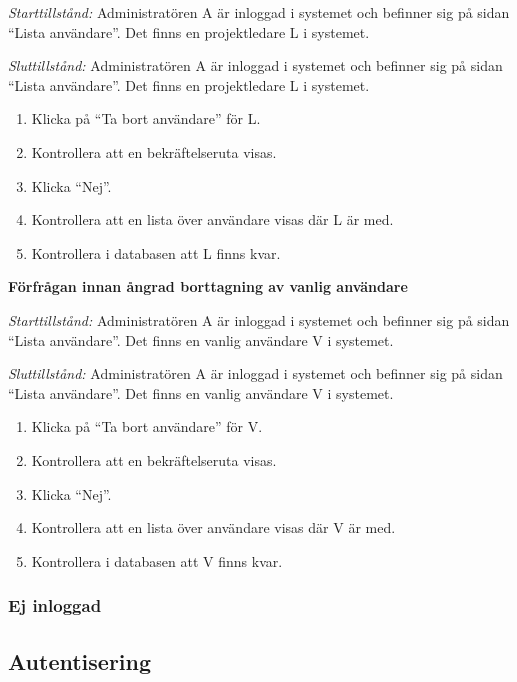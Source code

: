 \documentclass[a4paper]{article}
\begin{document}
\begin{FT}
\emph{Starttillstånd:} Administratören A är inloggad i systemet och befinner sig på sidan ``Lista användare''. Det finns en projektledare L i systemet.

\emph{Sluttillstånd:} Administratören A är inloggad i systemet och befinner sig på sidan ``Lista användare''. Det finns en projektledare L i systemet.

\begin{enumerate}
\item Klicka på ``Ta bort användare'' för L.
\item Kontrollera att en bekräftelseruta visas.
\item Klicka ``Nej''.
\item Kontrollera att en lista över användare visas där L är med.
\item Kontrollera i databasen att L finns kvar.
\end{enumerate}

\item \textbf{Förfrågan innan ångrad borttagning av vanlig användare}

\emph{Starttillstånd:} Administratören A är inloggad i systemet och befinner sig på sidan ``Lista användare''. Det finns en vanlig användare V i systemet.

\emph{Sluttillstånd:} Administratören A är inloggad i systemet och befinner sig på sidan ``Lista användare''. Det finns en vanlig användare V i systemet.

\begin{enumerate}
\item Klicka på ``Ta bort användare'' för V.
\item Kontrollera att en bekräftelseruta visas.
\item Klicka ``Nej''.
\item Kontrollera att en lista över användare visas där V är med.
\item Kontrollera i databasen att V finns kvar.
\end{enumerate}
\end{FT}

\subsubsection{Ej inloggad}



\subsection{Autentisering}
\end{document}
